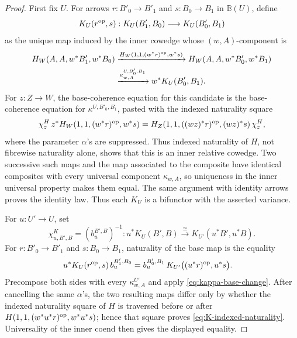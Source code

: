 \begin{proof}
First fix \(U\).  For arrows
\(r:B'_0\to B'_1\) and \(s:B_0\to B_1\) in \(\mathbb B(U)\), define
\[
  K_U(r^{\mathrm{op}},s):K_U(B'_1,B_0)\longrightarrow K_U(B'_0,B_1)
\]
as the unique map induced by the inner cowedge whose \((w,A)\)-component is
\begin{align*}
  H_W(A,A,w^*B'_1,w^*B_0)
  &\xrightarrow{H_W(1,1,(w^*r)^{\mathrm{op}},w^*s)}
  H_W(A,A,w^*B'_0,w^*B_1)
  \\
  &\xrightarrow{\kappa^{U,B'_0,B_1}_{w,A}}
  w^*K_U(B'_0,B_1).
\end{align*}
For \(z:Z\to W\), the base-coherence equation for this candidate is the
base-coherence equation for \(\kappa^{U,B'_0,B_1}\), pasted with the indexed
naturality square
\[
 \chi^H_z\,
 z^*H_W(1,1,(w^*r)^{\mathrm{op}},w^*s)
 =
 H_Z(1,1,((wz)^*r)^{\mathrm{op}},(wz)^*s)\,
 \chi^H_z,
\]
where the parameter \(\alpha\)'s are suppressed.  Thus indexed naturality
of \(H\), not fibrewise naturality alone, shows that this is an inner
relative cowedge.  Two successive such maps and the map associated to the
composite have identical
composites with every universal component \(\kappa_{w,A}\), so uniqueness in
the inner universal property makes them equal.  The same argument with
identity arrows proves the identity law.  Thus each \(K_U\) is a bifunctor
with the asserted variance.

For \(u:U'\to U\), set
\[
  \chi^K_{u,B',B}=(b_u^{B',B})^{-1}:
  u^*K_U(B',B)\xrightarrow{\ \cong\ }
  K_{U'}(u^*B',u^*B).
\]
For \(r:B'_0\to B'_1\) and \(s:B_0\to B_1\), naturality of the base map is
the equality
\begin{equation}
\begin{split}
 u^*K_U(r^{\mathrm{op}},s)\,b_u^{B'_1,B_0}
 ={}&
 b_u^{B'_0,B_1}\,
 K_{U'}\bigl((u^*r)^{\mathrm{op}},u^*s\bigr).
\end{split}
\label{eq:K-indexed-naturality}
\end{equation}
Precompose both sides with every \(\kappa^{U'}_{w,A}\) and apply
\cref{eq:kappa-base-change}.  After cancelling the same \(\alpha\)'s, the
two resulting maps differ only by whether the indexed naturality square of
\(H\) is traversed before or after
\(H(1,1,(w^*u^*r)^{\mathrm{op}},w^*u^*s)\); hence that square proves
\cref{eq:K-indexed-naturality}.  Universality of the inner coend then gives
the displayed equality.


\end{proof}
